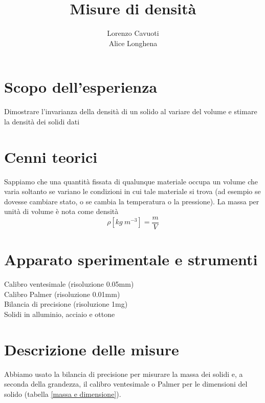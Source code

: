 \documentclass{article}
\title{Misure di densit\`{a}}
\author{Lorenzo Cavuoti \\ Alice Longhena}
\begin{document}
	\maketitle
	
	\section{Scopo dell'esperienza}
		Dimostrare l'invarianza della densit\`{a} di un solido al variare del volume e stimare la densità dei solidi dati
		
	\section{Cenni teorici}
		Sappiamo che una quantit\`{a} fissata di qualunque materiale occupa un volume che varia soltanto se variano le condizioni in cui tale materiale si trova (ad esempio se dovesse cambiare stato, o se cambia la temperatura o la pressione). La massa per unit\`{a} di volume è nota come densit\`{a}
		\begin{equation}
			\rho[kg\:m^{-3}] = \frac{m}{V}
			\label{densita}
		\end{equation}
	
	\section{Apparato sperimentale e strumenti}
		Calibro ventesimale (risoluzione 0.05mm)\\
		Calibro Palmer (risoluzione 0.01mm)\\
		Bilancia di precisione (risoluzione 1mg)\\
		Solidi in alluminio, acciaio e ottone\\
	
	\section{Descrizione delle misure}
		Abbiamo usato la bilancia di precisione per misurare la massa dei solidi e, a seconda della grandezza, il calibro ventesimale o Palmer per le dimensioni del solido (tabella \ref{massa e dimensione}).
		
\end{document}
